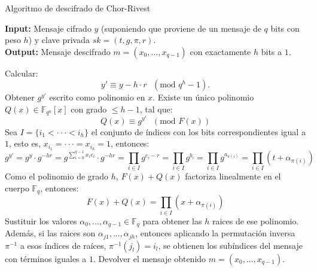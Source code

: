     \begin{algorithm}[H]
        \caption{Algoritmo de descifrado de Chor-Rivest}
        \textbf{Input:} Mensaje cifrado $y$ (suponiendo que proviene de un mensaje de $q$ bits con peso $h$) y clave privada $sk = (t, g, \pi, r)$.\\
        \textbf{Output:} Mensaje descifrado $m = (x_{0}, ... , x_{q-1})$ con exactamente $h$ bits a $1$.
        \bigskip
        \begin{algorithmic}[1]
            \State Calcular:
            \begin{equation}
                y' \equiv y - h \cdot r \text{ } ( \text{mod } q^{h} - 1).
            \end{equation}
            \State Obtener $g^{y'}$ escrito como polinomio en $x$. Existe un único polinomio $Q(x) \in \mathbb{F}_{q^{h}}[x]$ con grado $\leq h-1$, tal que:
            \begin{equation}
                Q(x) \equiv g^{y'} \text{ } ( \text{mod } F(x))
            \end{equation}
            Sea $I = \{i_{1} < \cdot \cdot \cdot < i_{h}\}$ el conjunto de índices con los bits correspondientes igual a $1$, esto es, $x_{i_{1}} = \cdot \cdot \cdot = x_{i_{h}} = 1$, entonces:
            \begin{equation}
                g^{y'} = g^{y} \cdot g^{-hr} = g^{\sum_{i=0}^{q-1} x_{i}c_{i}} \cdot g^{-hr} = \prod_{i \in I} g^{c_{i} - r} = \prod_{i \in I} g^{b_{i}} = \prod_{i \in I} g^{a_{\pi(i)}} = \prod_{i \in I} (t + \alpha_{\pi(i)})
            \end{equation}
            \State Como el polinomio de grado $h$, $F(x) + Q(x)$ factoriza linealmente en el cuerpo $\mathbb{F}_{q}$, entonces:
            \begin{equation}
                F(x) + Q(x) = \prod_{i \in I} (x + \alpha_{\pi(i)})
            \end{equation}
            \State Sustituir los valores $\alpha_{0}, ... , \alpha_{q-1} \in \mathbb{F}_{q}$ para obtener las $h$ raices de ese polinomio. Además, si las raices son $\alpha_{j1}, ... , \alpha_{jh}$, entonces aplicando la permutación inversa $\pi^{-1}$ a esos índices de raíces, $\pi^{-1}(j_{l}) = i_{l}$, se obtienen los subíndices del mensaje con términos iguales a $1$.
            \State Devolver el mensaje obtenido $m = (x_{0}, ... , x_{q-1})$.
        \end{algorithmic}
    \end{algorithm}
    
